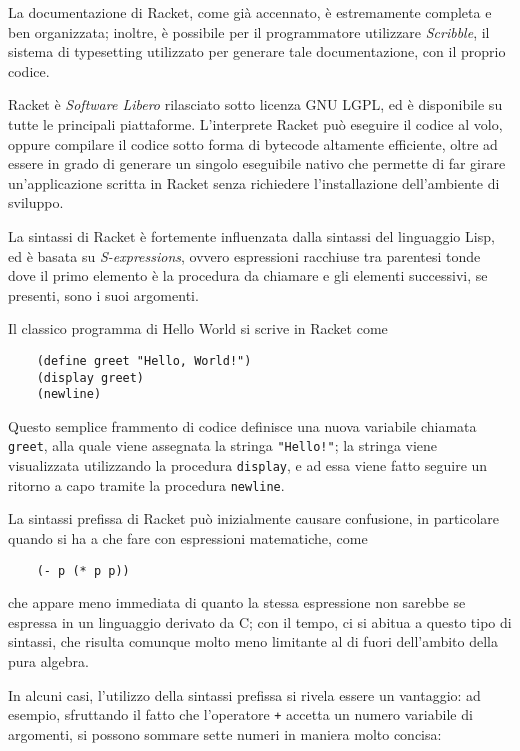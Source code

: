 La documentazione di Racket, come gi\`a accennato, \`e estremamente
completa e ben organizzata; inoltre, \`e possibile per il programmatore
utilizzare \emph{Scribble}, il sistema di typesetting utilizzato per
generare tale documentazione, con il proprio codice.

Racket \`e \emph{Software Libero} rilasciato sotto licenza GNU LGPL, ed
\`e disponibile su tutte le principali piattaforme. L'interprete Racket
pu\`o eseguire il codice al volo, oppure compilare il codice sotto forma
di bytecode altamente efficiente, oltre ad essere in grado di generare
un singolo eseguibile nativo che permette di far girare un'applicazione
scritta in Racket senza richiedere l'installazione dell'ambiente di
sviluppo.

La sintassi di Racket \`e fortemente influenzata dalla sintassi del
linguaggio Lisp, ed \`e basata su \emph{S-expressions}, ovvero espressioni
racchiuse tra parentesi tonde dove il primo elemento \`e la procedura
da chiamare e gli elementi successivi, se presenti, sono i suoi
argomenti.

Il classico programma di Hello World si scrive in Racket come

\begin{lstlisting}
    (define greet "Hello, World!")
    (display greet)
    (newline)
\end{lstlisting}

Questo semplice frammento di codice definisce una nuova variabile
chiamata \lstinline{greet}, alla quale viene assegnata la stringa
\lstinline{"Hello!"}; la stringa viene visualizzata utilizzando la
procedura \lstinline{display}, e ad essa viene fatto seguire un
ritorno a capo tramite la procedura \lstinline{newline}.

La sintassi prefissa di Racket pu\`o inizialmente causare confusione,
in particolare quando si ha a che fare con espressioni matematiche,
come

\begin{lstlisting}
    (- p (* p p))
\end{lstlisting}

che appare meno immediata di quanto la stessa espressione non sarebbe
se espressa in un linguaggio derivato da C; con il tempo, ci si abitua
a questo tipo di sintassi, che risulta comunque molto meno limitante
al di fuori dell'ambito della pura algebra.

In alcuni casi, l'utilizzo della sintassi prefissa si rivela essere un
vantaggio: ad esempio, sfruttando il fatto che l'operatore \lstinline{+}
accetta un numero variabile di argomenti, si possono sommare sette numeri
in maniera molto concisa:

